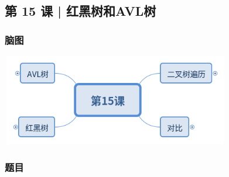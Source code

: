 \subsection{第 15 课 | 红黑树和AVL树}

\subsubsection{脑图}

\includegraphics[width=100mm,height=40mm]{images/camp/第15课.png}

\subsubsection{题目}
